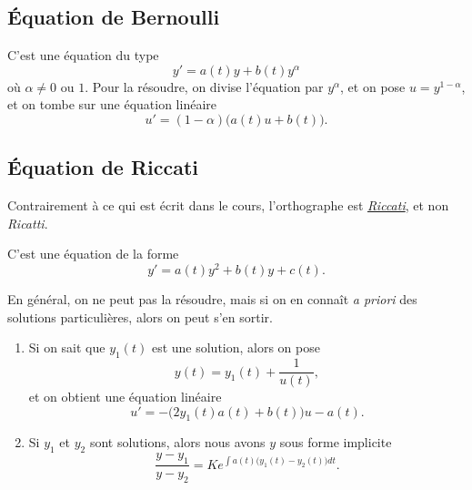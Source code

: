 					\subsection{Équation de Bernoulli}
\label{SubSecBernh}

C'est une équation du type
\begin{equation}	\label{EqBerNDiffalp}
	y'=a(t)y+b(t)y^{\alpha}
\end{equation}
où $\alpha\neq 0$ ou $1$. Pour la résoudre, on divise l'équation par $y^{\alpha}$, et on pose $u=y^{1-\alpha}$, et on tombe sur une équation linéaire
\begin{equation}
	u'=(1-\alpha)\big( a(t)u+b(t) \big).
\end{equation}


					\subsection{Équation de Riccati}
\label{SubSecRicatti}

Contrairement à ce qui est écrit dans le cours, l'orthographe est \emph{\href{http://fr.wikipedia.org/wiki/Jacopo_Riccati}{Riccati}}, et non \emph{Ricatti}.

C'est une équation de la forme 
\begin{equation}		\label{EqDiffGFeneRicatti}
	y'=a(t)y^2+b(t)y+c(t).
\end{equation}

En général, on ne peut pas la résoudre, mais si on en connaît \emph{a priori} des solutions particulières, alors on peut s'en sortir.

\begin{enumerate}

\item 
Si on sait que $y_1(t)$ est une solution, alors on pose
\begin{equation}
	y(t)=y_1(t)+\frac{1}{ u(t) },
\end{equation}
et on obtient une équation linéaire
\begin{equation}
	u'=-\big( 2y_1(t)a(t)+b(t) \big)u-a(t).
\end{equation}

\item
Si $y_1$ et $y_2$ sont solutions, alors nous avons $y$ sous forme implicite
\begin{equation}
	\frac{ y-y_1 }{ y-y_2 }=K e^{\int a(t)\big( y_1(t)-y_2(t) \big)dt}.
\end{equation}
\end{enumerate}

